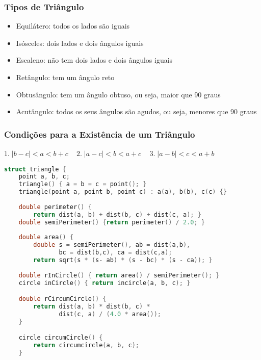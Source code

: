 \subsubsection*{Tipos de Triângulo}
\begin{itemize}
\item Equilátero: todos os lados são iguais
\item Isósceles: dois lados e dois ângulos iguais
\item Escaleno: não tem dois lados e dois ângulos iguais
\item Retângulo: tem um ângulo reto
\item Obtusângulo:  tem um ângulo obtuso, ou seja, maior que 90 graus
\item Acutângulo: todos os seus ângulos são agudos, ou seja, menores que 90 graus
\end{itemize}

\subsubsection*{Condições para a Existência de um Triângulo}
\begin{center}
\(1.\;| b - c | < a < b + c\;\;\;\)
\(2.\;| a - c | < b < a + c\;\;\;\) 
\(3.\;| a - b | < c < a + b\)
\end{center}

\begin{lstlisting}[language=C++, title=Parte I de II]
struct triangle {
	point a, b, c;
	triangle() { a = b = c = point(); }
	triangle(point a, point b, point c) : a(a), b(b), c(c) {}
	
	double perimeter() { 
	    return dist(a, b) + dist(b, c) + dist(c, a); }
	double semiPerimeter() {return perimeter() / 2.0; }
	
	double area() {
		double s = semiPerimeter(), ab = dist(a,b), 
		       bc = dist(b,c), ca = dist(c,a);
		return sqrt(s * (s- ab) * (s - bc) * (s - ca)); }
		
	double rInCircle() { return area() / semiPerimeter(); }
	circle inCircle() { return incircle(a, b, c); }

	double rCircumCircle() {
		return dist(a, b) * dist(b, c) * 
		       dist(c, a) / (4.0 * area());
	}

	circle circumCircle() {
		return circumcircle(a, b, c);
	}
\end{lstlisting}

\newpage

